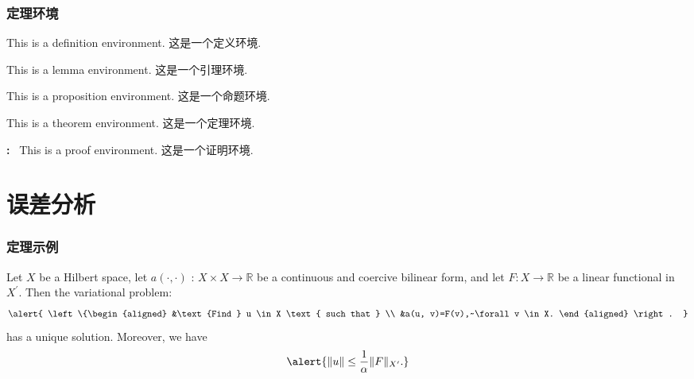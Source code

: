 \documentclass[noamsthm,notheorems,11pt,compress]{beamer}
\numberwithin{figure}{section}
\numberwithin{table}{section}
\numberwithin{equation}{section}
\theoremstyle{plain} %
\newenvironment{proof}{\par{\bfseries\color{structure.fg}{证明}:}\rmfamily~}{\par}
\begin{document}
\begin{frame}
\frametitle{定理环境}
\begin{definition}
This is a definition environment. 这是一个定义环境.
\end{definition}

\begin{lemma}
This is a lemma environment. 这是一个引理环境.
\end{lemma}

\begin{proposition}
This is a proposition environment. 这是一个命题环境.
\end{proposition}

\begin{theorem}\label{thm:MassEnergy}
This is a theorem environment. 这是一个定理环境.
\end{theorem}

\begin{proof}
  This is a proof environment. 这是一个证明环境.
\end{proof}

\end{frame}

\section{误差分析}

\begin{frame}
\frametitle{定理示例}

\begin{theorem}
Let $X$ be a Hilbert space, let $a(\cdot, \cdot)$ : $X \times X \rightarrow \mathbb{R}$ be a continuous and coercive bilinear form, and let $F : X \rightarrow \mathbb{R}$ be a linear functional in $X^{\prime}$. Then the variational problem:
\begin{equation}
  \alert{
  \left\{\begin{aligned}
  &\text {Find } u \in X \text { such that } \\
  &a(u, v)=F(v),~\forall v \in X.
  \end{aligned} \right. }
\end{equation}
has a unique solution. Moreover, we have
\begin{equation}
  \alert{ \|u\| \leq \frac{1}{\alpha}\|F\|_{X^{\prime}}.  }
\end{equation}
\end{theorem}

\end{frame}
\end{document}

